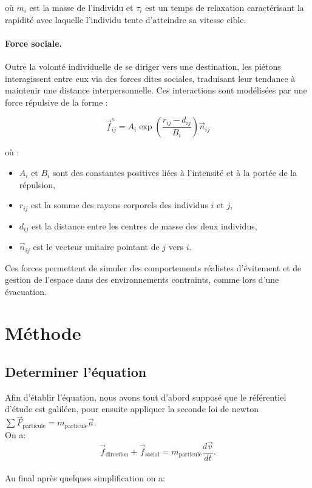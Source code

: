 \documentclass[a4paper,12pt]{article}
\begin{document}
où $m_i$ est la masse de l'individu et $\tau_i$ est un temps de relaxation caractérisant la rapidité avec laquelle l'individu tente d’atteindre sa vitesse cible.

\paragraph{Force sociale.}
Outre la volonté individuelle de se diriger vers une destination, les piétons interagissent entre eux via des forces dites sociales, traduisant leur tendance à maintenir une distance interpersonnelle. Ces interactions sont modélisées par une force répulsive de la forme :

\begin{equation}
\label{eq:force_sociale}
\vec{f}_{ij}^{\text{s}} = A_i \exp\left(\frac{r_{ij} - d_{ij}}{B_i}\right) \vec{n}_{ij}
\end{equation}

où :
\begin{itemize}
  \item $A_i$ et $B_i$ sont des constantes positives liées à l'intensité et à la portée de la répulsion,
  \item $r_{ij}$ est la somme des rayons corporels des individus $i$ et $j$,
  \item $d_{ij}$ est la distance entre les centres de masse des deux individus,
  \item $\vec{n}_{ij}$ est le vecteur unitaire pointant de $j$ vers $i$.
\end{itemize}

Ces forces permettent de simuler des comportements réalistes d’évitement et de gestion de l’espace dans des environnements contraints, comme lors d’une évacuation.


\section{Méthode}

\subsection{Determiner l'équation}

\indent Afin d’établir l’équation, nous avons tout d’abord supposé que le référentiel d’étude est galiléen, pour ensuite appliquer la seconde loi de newton $\sum \vec{F}_{\text{particule}} = m_{\text{particule}} \vec{a}$.
\\On a:
\[
\vec{f}_{\text{direction}} + \vec{f}_{\text{social}} = m_{\text{particule}} \frac{d\vec{v}}{dt}.
\]
\\ Au final après quelques simplification on a:
\end{document}
